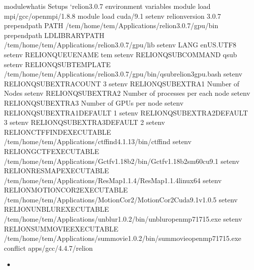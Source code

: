 \documentclass[letterpaper,10pt,english]{sphinxmanual}
\begin{document}
\begin{sphinxVerbatim}[commandchars=\\\{\}]
module\PYGZhy{}whatis    Setups {}`relion\PYGZhy{}3.0.7\PYGZsq{} environment variables
module           load mpi/gcc/openmpi/1.8.8
module           load cuda/9.1
setenv           relion\PYGZus{}version 3.0.7
prepend\PYGZhy{}path     PATH /tem/home/tem/\PYGZus{}Applications/relion\PYGZhy{}3.0.7/gpu/bin
prepend\PYGZhy{}path     LD\PYGZus{}LIBRARY\PYGZus{}PATH /tem/home/tem/\PYGZus{}Applications/relion\PYGZhy{}3.0.7/gpu/lib
setenv           LANG en\PYGZus{}US.UTF\PYGZhy{}8
setenv           RELION\PYGZus{}QUEUE\PYGZus{}NAME tem
setenv           RELION\PYGZus{}QSUB\PYGZus{}COMMAND qsub
setenv           RELION\PYGZus{}QSUB\PYGZus{}TEMPLATE /tem/home/tem/\PYGZus{}Applications/relion\PYGZhy{}3.0.7/gpu/bin/qsub\PYGZhy{}relion3\PYGZhy{}gpu.bash
setenv           RELION\PYGZus{}QSUB\PYGZus{}EXTRA\PYGZus{}COUNT 3
setenv           RELION\PYGZus{}QSUB\PYGZus{}EXTRA1 Number of Nodes
setenv           RELION\PYGZus{}QSUB\PYGZus{}EXTRA2 Number of processes per each node
setenv           RELION\PYGZus{}QSUB\PYGZus{}EXTRA3 Number of GPUs per node
setenv           RELION\PYGZus{}QSUB\PYGZus{}EXTRA1\PYGZus{}DEFAULT 1
setenv           RELION\PYGZus{}QSUB\PYGZus{}EXTRA2\PYGZus{}DEFAULT 3
setenv           RELION\PYGZus{}QSUB\PYGZus{}EXTRA3\PYGZus{}DEFAULT 2
setenv           RELION\PYGZus{}CTFFIND\PYGZus{}EXECUTABLE /tem/home/tem/\PYGZus{}Applications/ctffind\PYGZhy{}4.1.13/bin/ctffind
setenv           RELION\PYGZus{}GCTF\PYGZus{}EXECUTABLE /tem/home/tem/\PYGZus{}Applications/Gctf\PYGZus{}v1.18\PYGZus{}b2/bin/Gctf\PYGZus{}v1.18\PYGZus{}b2\PYGZus{}sm60\PYGZus{}cu9.1
setenv           RELION\PYGZus{}RESMAP\PYGZus{}EXECUTABLE /tem/home/tem/\PYGZus{}Applications/ResMap\PYGZhy{}1.1.4/ResMap\PYGZhy{}1.1.4\PYGZhy{}linux64
setenv           RELION\PYGZus{}MOTIONCOR2\PYGZus{}EXECUTABLE /tem/home/tem/\PYGZus{}Applications/MotionCor2/MotionCor2\PYGZus{}Cuda9.1\PYGZus{}v1.0.5
setenv           RELION\PYGZus{}UNBLUR\PYGZus{}EXECUTABLE /tem/home/tem/\PYGZus{}Applications/unblur\PYGZus{}1.0.2/bin/unblur\PYGZus{}openmp\PYGZus{}7\PYGZus{}17\PYGZus{}15.exe
setenv           RELION\PYGZus{}SUMMOVIE\PYGZus{}EXECUTABLE /tem/home/tem/\PYGZus{}Applications/summovie\PYGZus{}1.0.2/bin/sum\PYGZus{}movie\PYGZus{}openmp\PYGZus{}7\PYGZus{}17\PYGZus{}15.exe
conflict         apps/gcc/4.4.7/relion
\PYGZhy{}\PYGZhy{}\PYGZhy{}\PYGZhy{}\PYGZhy{}\PYGZhy{}\PYGZhy{}\PYGZhy{}\PYGZhy{}\PYGZhy{}\PYGZhy{}\PYGZhy{}\PYGZhy{}\PYGZhy{}\PYGZhy{}\PYGZhy{}\PYGZhy{}\PYGZhy{}\PYGZhy{}\PYGZhy{}\PYGZhy{}\PYGZhy{}\PYGZhy{}\PYGZhy{}\PYGZhy{}\PYGZhy{}\PYGZhy{}\PYGZhy{}\PYGZhy{}\PYGZhy{}\PYGZhy{}\PYGZhy{}\PYGZhy{}\PYGZhy{}\PYGZhy{}\PYGZhy{}\PYGZhy{}\PYGZhy{}\PYGZhy{}\PYGZhy{}\PYGZhy{}\PYGZhy{}\PYGZhy{}\PYGZhy{}\PYGZhy{}\PYGZhy{}\PYGZhy{}\PYGZhy{}\PYGZhy{}\PYGZhy{}\PYGZhy{}\PYGZhy{}\PYGZhy{}\PYGZhy{}\PYGZhy{}\PYGZhy{}\PYGZhy{}\PYGZhy{}\PYGZhy{}\PYGZhy{}\PYGZhy{}\PYGZhy{}\PYGZhy{}\PYGZhy{}\PYGZhy{}\PYGZhy{}\PYGZhy{}
\end{sphinxVerbatim}
\begin{itemize}
\item {} 

\end{itemize}
\end{document}
